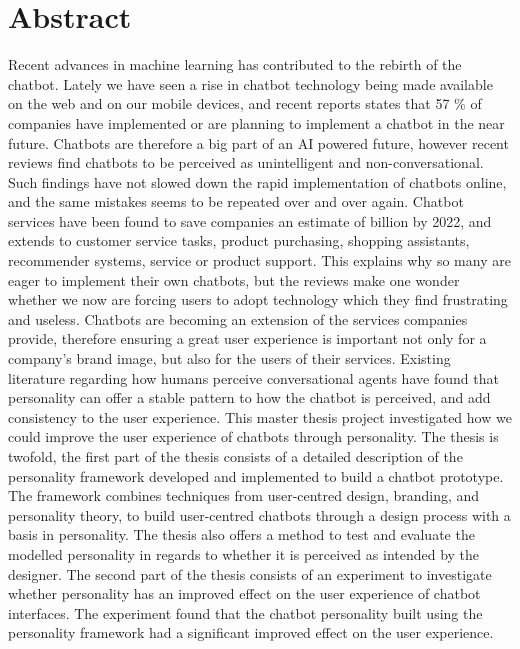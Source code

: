 \chapter*{Abstract}

Recent advances in machine learning has contributed to the rebirth of the chatbot. Lately we have seen a rise in chatbot technology being made available on the web and on our mobile devices, and recent reports states that 57 \% of companies have implemented or are planning to implement a chatbot in the near future. Chatbots are therefore a big part of an AI powered future, however recent reviews find chatbots to be perceived as unintelligent and non-conversational. Such findings have not slowed down the rapid implementation of chatbots online, and the same mistakes seems to be repeated over and over again. Chatbot services have been found to save companies an estimate of  billion by 2022, and extends to customer service tasks, product purchasing, shopping assistants, recommender systems, service or product support. This explains why so many are eager to implement their own chatbots, but the reviews make one wonder whether we now are forcing users to adopt technology which they find frustrating and useless. Chatbots are becoming an extension of the services companies provide, therefore ensuring a great user experience is important not only for a company's brand image, but also for the users of their services. Existing literature regarding how humans perceive conversational agents have found that personality can offer a stable pattern to how the chatbot is perceived, and add consistency to the user experience. This master thesis project investigated how we could improve the user experience of chatbots through personality. The thesis is twofold, the first part of the thesis consists of a detailed description of the personality framework developed and implemented to build a chatbot prototype. The framework combines techniques from user-centred design, branding, and personality theory, to build user-centred chatbots through a design process with a basis in personality.  The thesis also offers a method to test and evaluate the modelled personality in regards to whether it is perceived as intended by the designer. The second part of the thesis consists of an experiment to investigate whether personality has an improved effect on the user experience of chatbot interfaces. The experiment found that the chatbot personality built using the personality framework had a significant improved effect on the user experience.

\hypersetup{pageanchor=false}